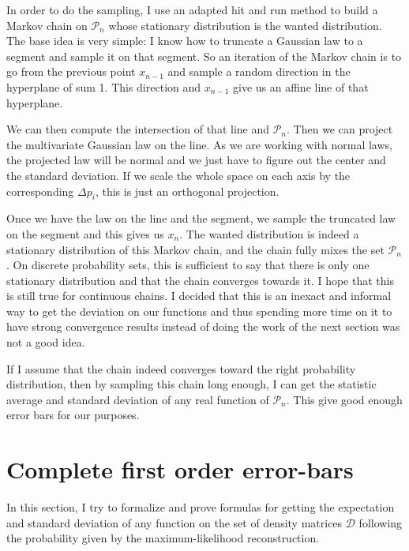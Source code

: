 \documentclass[10pt,a4paper]{report}
\theoremstyle{plain}
\theoremstyle{definition}
\theoremstyle{remark}
\begin{document}
In order to do the sampling, I use an adapted hit and run method to build a
Markov chain on $\mathcal{P}_n$ whose stationary
distribution is the wanted distribution. The base idea is very simple: I know how to
truncate a Gaussian law to a segment and sample it on that segment. So an
iteration of the Markov chain is to go from the previous point $x_{n-1}$ and
sample a random direction in the hyperplane of sum 1. This direction and
$x_{n-1}$ give us an affine line of that hyperplane.

We can then compute the
intersection of that line and $\mathcal{P}_n$. Then we can project the
multivariate Gaussian law on the line. As we are working with normal laws, the
projected law will be normal and we just have to figure out the center and the
standard deviation. If we scale the whole space on each axis by the
corresponding $\Delta p_i$, this is just an orthogonal projection.

Once we have the law on the line and the segment, we sample the truncated law on
the segment and this gives us $x_n$. The wanted distribution is indeed a
stationary distribution of this Markov chain, and the chain fully mixes the set
$\mathcal{P}_n$. On discrete probability sets, this is sufficient to say that there
is only one stationary distribution and that the chain converges towards it. I
hope that this is still true for continuous chains. I decided that this is an inexact
and informal way to get the deviation on our functions and thus spending more time
on it to have strong convergence results
instead of doing the work of the next section was not a good idea.

If I assume that the chain indeed converges toward the right probability
distribution, then by sampling this chain long enough, I
can get the statistic average and standard deviation of any real function of
$\mathcal{P}_n$. This give good enough error bars for our purposes.

\section{Complete first order error-bars}\label{sec:errbar}

In this section, I try to formalize and prove formulas for getting the
expectation and standard deviation of any function on the set of density
matrices $\mathcal{D}$ following the probability given by the maximum-likelihood
reconstruction.
\end{document}
